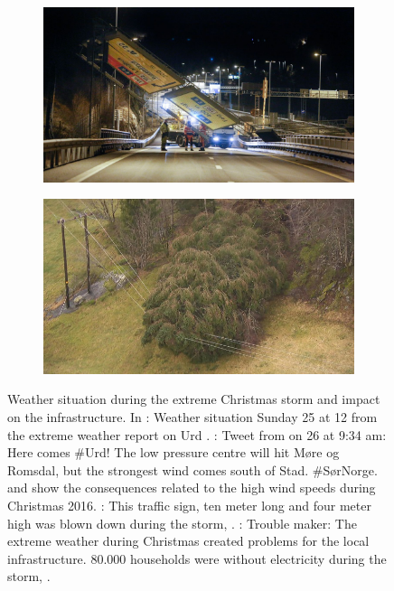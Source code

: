 \begin{figure}[t!]
\begin{subfigure}[b]{0.49\textwidth}
		\includegraphics[width=\textwidth]{./fig_introduction/street_sign_2512.jpg}
		\caption{}\label{fig:street_sign}
	\end{subfigure}
\hfill
	\begin{subfigure}[b]{0.49\textwidth}
		\includegraphics[width=\textwidth]{./fig_introduction/tree_nrk_2812.jpg}
		\caption{}\label{fig:tree_elec}
	\end{subfigure}
\caption{Weather situation during the extreme Christmas storm and impact on the infrastructure. In \protect{}: Weather situation Sunday \SI{25}{\dec} at \SI{12}{\UTC} from the extreme weather report on Urd \citep{olsen_ekstremvaerrapport._2017}.
	\protect{}: Tweet from \cite{meteorologene_her_2016} on \SI{26}{\dec} at 9:34 am: Here comes \#Urd! The low pressure centre will hit M{\o}re og Romsdal, but the strongest wind comes south of Stad. \#S{\o}rNorge.
    \protect{} and \protect{} show the consequences related to the high wind speeds during Christmas 2016.
	\protect{}: This traffic sign, ten meter long and four meter high was blown down during the storm, \citep{ruud_tonn_2016}.
	\protect{}: Trouble maker: The extreme weather during Christmas created problems for the local infrastructure. \num{80.000} households were without electricity during the storm, \citep{farestveit_80.000_2016}.} \label{fig:news}
\end{figure}